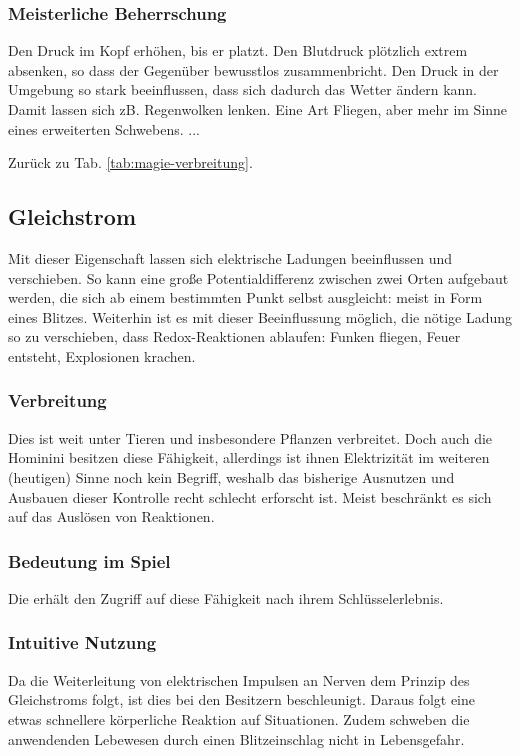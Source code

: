\subsubsection{Meisterliche Beherrschung} 
\begin{outline}
	\1 Den Druck im Kopf erhöhen, bis er platzt.
	\1 Den Blutdruck plötzlich extrem absenken, so dass der Gegenüber bewusstlos zusammenbricht. 
	\1 Den Druck in der Umgebung so stark beeinflussen, dass sich dadurch das Wetter ändern kann. Damit lassen sich zB. Regenwolken lenken. 
	\1 Eine Art Fliegen, aber mehr im Sinne eines erweiterten Schwebens.
	\1 ...
\end{outline}
Zurück zu Tab. \ref{tab:magie-verbreitung}.



\subsection{Gleichstrom}\label{sec:gleichstrommagie}
Mit dieser Eigenschaft lassen sich elektrische Ladungen beeinflussen und verschieben.
So kann eine große Potentialdifferenz zwischen zwei Orten aufgebaut werden, die sich ab einem bestimmten Punkt selbst ausgleicht: meist in Form eines Blitzes.
Weiterhin ist es mit dieser Beeinflussung möglich, die nötige Ladung so zu verschieben, dass Redox-Reaktionen ablaufen: Funken fliegen, Feuer entsteht, Explosionen krachen.

\subsubsection{Verbreitung}
Dies ist weit unter Tieren und insbesondere Pflanzen verbreitet. 
Doch auch die Hominini besitzen diese Fähigkeit, allerdings ist ihnen Elektrizität im weiteren (heutigen) Sinne noch kein Begriff, weshalb das bisherige Ausnutzen und Ausbauen dieser Kontrolle recht schlecht erforscht ist.
Meist beschränkt es sich auf das Auslösen von Reaktionen.

\subsubsection{Bedeutung im Spiel}
Die  erhält den Zugriff auf diese Fähigkeit nach ihrem Schlüsselerlebnis. 

\subsubsection{Intuitive Nutzung}
Da die Weiterleitung von elektrischen Impulsen an Nerven dem Prinzip des Gleichstroms folgt, ist dies bei den Besitzern beschleunigt.
Daraus folgt eine etwas schnellere körperliche Reaktion auf Situationen.
Zudem schweben die anwendenden Lebewesen durch einen Blitzeinschlag nicht in Lebensgefahr.  

